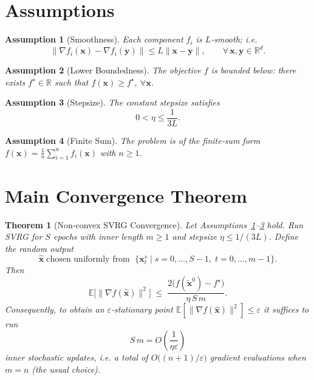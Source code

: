 \documentclass{article}
\newtheorem{theorem}{Theorem}
\newtheorem{assumption}{Assumption}
\begin{document}
\section*{Assumptions}
\begin{assumption}[Smoothness]\label{as:smooth}
Each component $f_i$ is $L$‑smooth; i.e.
\[
\|\nabla f_i(\mathbf{x})-\nabla f_i(\mathbf{y})\|\le L\|\mathbf{x}-\mathbf{y}\|,
\qquad\forall\,\mathbf{x},\mathbf{y}\in\mathbb{R}^{d}.
\]
\end{assumption}
\begin{assumption}[Lower Boundedness]\label{as:lb}
The objective $f$ is bounded below: there exists $f^\star\in\mathbb{R}$ such that
\(f(\mathbf{x})\ge f^\star,\ \forall\mathbf{x}\).
\end{assumption}
\begin{assumption}[Stepsize]\label{as:stepsize}
The constant stepsize satisfies
\[
0<\eta \le \frac{1}{3L}.
\]
\end{assumption}
\begin{assumption}[Finite Sum]\label{as:finitesum}
The problem is of the finite‑sum form $f(\mathbf{x})=\frac{1}{n}\sum_{i=1}^n f_i(\mathbf{x})$ with $n\ge 1$.
\end{assumption}

\section*{Main Convergence Theorem}
\begin{theorem}[Non‑convex SVRG Convergence]\label{thm:svrg}
Let Assumptions~\ref{as:smooth}–\ref{as:stepsize} hold.  
Run SVRG for $S$ epochs with inner length $m\ge 1$ and stepsize $\eta\le 1/(3L)$.  
Define the random output
\[
\widehat{\mathbf{x}}\;\text{chosen uniformly from }\;
\bigl\{\mathbf{x}_t^{s}\mid s=0,\dots ,S-1,\;t=0,\dots ,m-1\bigr\}.
\]
Then
\[
\mathbb{E}\bigl[\|\nabla f(\widehat{\mathbf{x}})\|^{2}\bigr]
\;\le\;
\frac{2\bigl(f(\tilde{\mathbf{x}}^{0})-f^\star\bigr)}{\eta\,S\,m}.
\tag{5}
\]
Consequently, to obtain an $\varepsilon$‑stationary point
\(\mathbb{E}[\|\nabla f(\widehat{\mathbf{x}})\|^{2}]\le\varepsilon\) it suffices to run
\[
S\,m = O\!\left(\frac{1}{\eta\varepsilon}\right)
\]
inner stochastic updates, i.e. a total of $O\bigl((n+1)/\varepsilon\bigr)$ gradient evaluations
when $m=n$ (the usual choice).
\end{theorem}
\end{document}
